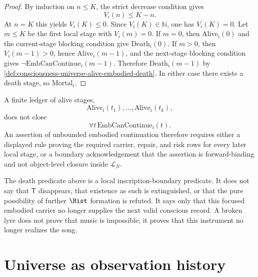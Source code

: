 \begin{proof}
By induction on $n\le K$, the strict decrease condition gives
$$
V_i(n)\le K-n.
$$
At $n=K$ this yields $V_i(K)\le 0$. Since $V_i(K)\in\mathbb{N}$, one has $V_i(K)=0$. Let $m\le K$ be the first local stage with $V_i(m)=0$. If $m=0$, then $\mathrm{Alive}_i(0)$ and the current-stage blocking condition give $\mathrm{Death}_i(0)$. If $m>0$, then $V_i(m-1)>0$, hence $\mathrm{Alive}_i(m-1)$, and the next-stage blocking condition gives $\neg\mathrm{EmbCanContinue}_i(m-1)$. Therefore $\mathrm{Death}_i(m-1)$ by \autoref{def:consciousness-universe-alive-embodied-death}. In either case there exists a death stage, so $\mathrm{Mortal}_i$.
\end{proof}

\begin{corollary}
\label{cor:consciousness-universe-finite-records-do-not-close-immortality}
A finite ledger of alive stages,
$$
\mathrm{Alive}_i(t_1),\ldots,\mathrm{Alive}_i(t_k),
$$
does not close
$$
\forall t\,\mathrm{EmbCanContinue}_i(t).
$$
An assertion of unbounded embodied continuation therefore requires either a displayed rule proving the required carrier, repair, and risk rows for every later local stage, or a boundary acknowledgement that the assertion is forward-binding and not object-level closure inside $\mathcal{L}_N$.
\end{corollary}

\begin{remark}
\label{rem:consciousness-universe-death-not-t}
The death predicate above is a local inscription-boundary predicate. It does not say that $\mathsf{T}$ disappears, that existence as such is extinguished, or that the pure possibility of further $\Hist$ formation is refuted. It says only that this focused embodied carrier no longer supplies the next valid conscious record. A broken lyre does not prove that music is impossible; it proves that this instrument no longer realizes the song.
\end{remark}


\section{Universe as observation history}
\label{sec:consciousness-universe-universe-as-history}

